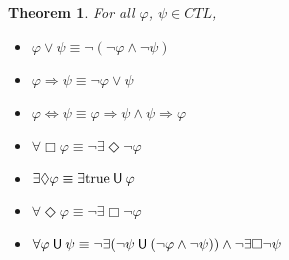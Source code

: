 \documentclass[12pt]{article}
\newcommand{\always}{\Box}
\newcommand{\eventually}{\Diamond}
\newcommand{\until}{\mathbin{\sf U}}
\newcommand{\TRUE}{\mbox{\lstinline{true}}}
\newtheorem{theorem}{Theorem}
\theoremstyle{definition}
\begin{document}
\begin{theorem}
\label{theorem:equivalences}
For all $\varphi$, $\psi \in \mathit{CTL}$,
\begin{itemize}
\item 
$\varphi \vee \psi \equiv \neg(\neg \varphi \wedge \neg \psi)$
\item
$\varphi \Rightarrow \psi \equiv \neg \varphi \vee \psi$
\item
$\varphi \Leftrightarrow \psi \equiv \varphi \Rightarrow \psi \wedge \psi \Rightarrow \varphi$
\item
$\forall \always \varphi \equiv \neg \exists \eventually \neg \varphi$
\item
$\exists \eventually \varphi \equiv \exists \TRUE \until \varphi$
\item
$\forall \eventually \varphi \equiv \neg \exists \always \neg \varphi$
\item
$\forall \varphi \until \psi \equiv \neg \exists (\neg \psi \until (\neg \varphi \wedge \neg \psi)) \wedge \neg \exists \always \neg \psi$
\end{itemize}
\end{theorem}
\end{document}
